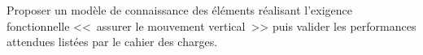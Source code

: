 \fi
\begin{obj}
Proposer un modèle de connaissance des éléments réalisant l’exigence fonctionnelle <<~assurer le mouvement vertical~>> puis valider les performances attendues listées par le cahier des charges.
\end{obj}



%
%
%
%
%
%
%
%
%
